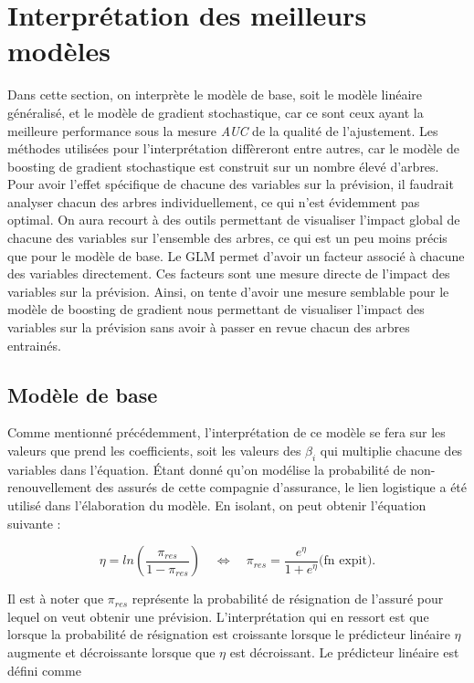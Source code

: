 \documentclass[]{article}
\begin{document}
\newpage

\section{Interprétation des meilleurs
modèles}\label{interpruxe9tation-des-meilleurs-moduxe8les}

Dans cette section, on interprète le modèle de base, soit le modèle
linéaire généralisé, et le modèle de gradient stochastique, car ce sont
ceux ayant la meilleure performance sous la mesure \emph{AUC} de la
qualité de l'ajustement. Les méthodes utilisées pour l'interprétation
diffèreront entre autres, car le modèle de boosting de gradient
stochastique est construit sur un nombre élevé d'arbres. Pour avoir
l'effet spécifique de chacune des variables sur la prévision, il
faudrait analyser chacun des arbres individuellement, ce qui n'est
évidemment pas optimal. On aura recourt à des outils permettant de
visualiser l'impact global de chacune des variables sur l'ensemble des
arbres, ce qui est un peu moins précis que pour le modèle de base. Le
GLM permet d'avoir un facteur associé à chacune des variables
directement. Ces facteurs sont une mesure directe de l'impact des
variables sur la prévision. Ainsi, on tente d'avoir une mesure semblable
pour le modèle de boosting de gradient nous permettant de visualiser
l'impact des variables sur la prévision sans avoir à passer en revue
chacun des arbres entrainés.

\subsection{Modèle de base}\label{moduxe8le-de-base-1}

Comme mentionné précédemment, l'interprétation de ce modèle se fera sur
les valeurs que prend les coefficients, soit les valeurs des \(\beta_i\)
qui multiplie chacune des variables dans l'équation. Étant donné qu'on
modélise la probabilité de non-renouvellement des assurés de cette
compagnie d'assurance, le lien logistique a été utilisé dans
l'élaboration du modèle. En isolant, on peut obtenir l'équation suivante
:

\[\eta = ln\left(\frac{\pi_{res}}{1 - \pi_{res}}\right) \quad \Leftrightarrow \quad \pi_{res} = \frac{e^{\eta}}{1 + e^{\eta}} \text{(fn expit)}.\]

Il est à noter que \(\pi_{res}\) représente la probabilité de
résignation de l'assuré pour lequel on veut obtenir une prévision.
L'interprétation qui en ressort est que lorsque la probabilité de
résignation est croissante lorsque le prédicteur linéaire \(\eta\)
augmente et décroissante lorsque que \(\eta\) est décroissant. Le
prédicteur linéaire est défini comme
\end{document}
